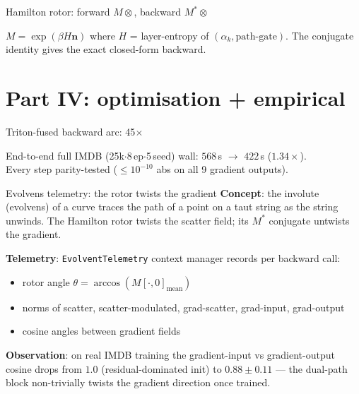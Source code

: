 \documentclass[aspectratio=169, 11pt]{beamer}
\begin{document}
\begin{frame}{Hamilton rotor: forward $M \otimes$, backward $M^{*} \otimes$}
  \centering
  \resizebox{0.93\textwidth}{!}{}

  \vspace{2mm}
  \footnotesize
  $M = \exp(\beta H \mathbf{n})$ where $H$ = layer-entropy of
  $(\alpha_k, \text{path-gate})$. The conjugate identity gives the
  exact closed-form backward.
\end{frame}

\section{Part IV: optimisation + empirical}

\begin{frame}{Triton-fused backward arc: 45$\times$}
  \centering
  \resizebox{0.92\textwidth}{!}{}

  \vspace{2mm}
  \scriptsize
  End-to-end full IMDB (25k$\cdot$8\,ep$\cdot$5\,seed) wall:
  $568$\,s $\to$ $422$\,s ($1.34\times$).
  \\
  Every step parity-tested ($\leq 10^{-10}$ abs on all 9 gradient outputs).
\end{frame}

\begin{frame}{Evolvens telemetry: the rotor twists the gradient}
  \textbf{Concept}: the involute (evolvens) of a curve traces the path
  of a point on a taut string as the string unwinds. The Hamilton rotor
  twists the scatter field; its $M^{*}$ conjugate untwists the gradient.

  \vspace{2mm}
  \textbf{Telemetry}: \texttt{EvolventTelemetry} context manager
  records per backward call:
  \begin{itemize}
  \item rotor angle $\theta = \arccos(M[\cdot,0]_{\text{mean}})$
  \item norms of scatter, scatter-modulated, grad-scatter,
        grad-input, grad-output
  \item cosine angles between gradient fields
  \end{itemize}

  \vspace{2mm}
  \textbf{Observation}: on real IMDB training the gradient-input vs
  gradient-output cosine drops from $1.0$ (residual-dominated init)
  to $0.88 \pm 0.11$ --- the dual-path block non-trivially twists
  the gradient direction once trained.
\end{frame}
\end{document}

